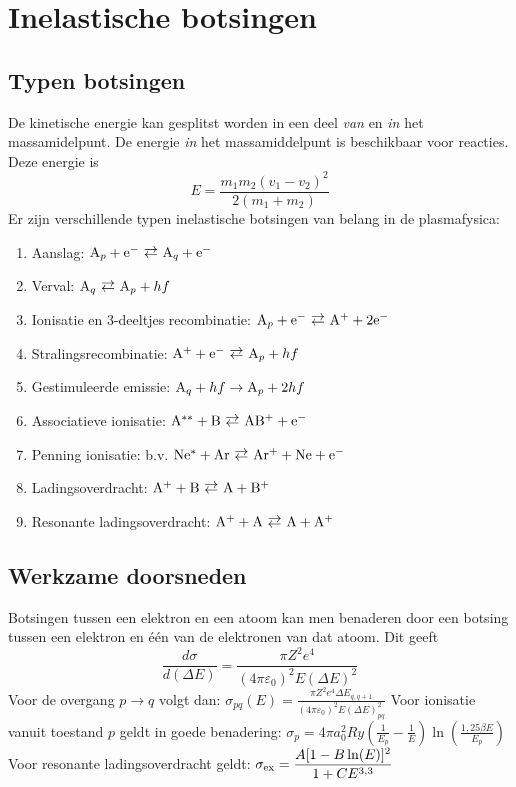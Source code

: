 \section{Inelastische botsingen}
\subsection{Typen botsingen}
De kinetische energie kan gesplitst worden in een deel {\it van} en {\it in}
het massamidelpunt. De energie {\it in} het massamiddelpunt is beschikbaar
voor reacties. Deze energie is
\[
E=\frac{m_1m_2(v_1-v_2)^2}{2(m_1+m_2)}
\]
Er zijn verschillende typen inelastische botsingen van belang in de plasmafysica:
\begin{enumerate}
\item Aanslag: ${\rm A}_p+{\rm e}^-\rlarrow{\rm A}_q+{\rm e}^-$
\item Verval: ${\rm A}_q\rlarrow{\rm A}_p+hf$
\item Ionisatie en 3-deeltjes recombinatie:
      ${\rm A}_p+{\rm e}^-\rlarrow{\rm A}^++2{\rm e}^-$
\item Stralingsrecombinatie: ${\rm A}^++{\rm e}^-\rlarrow{\rm A}_p+hf$
\item Gestimuleerde emissie: ${\rm A}_q+hf\rightarrow{\rm A}_p+2hf$
\item Associatieve ionisatie: $\rm A^{**}+B\rlarrow AB^++e^-$
\item Penning ionisatie: b.v. $\rm Ne^*+Ar\rlarrow Ar^++Ne+e^-$
\item Ladingsoverdracht: $\rm A^++B\rlarrow A+ B^+$
\item Resonante ladingsoverdracht: $\rm A^++A\rlarrow A+A^+$
\end{enumerate}

\subsection{Werkzame doorsneden}
Botsingen tussen een elektron en een atoom kan men benaderen door een
botsing tussen een elektron en \'e\'en van de elektronen van dat atoom. Dit
geeft
\[
\frac{d\sigma}{d(\Delta E)}=\frac{\pi Z^2 e^4}{(4\pi\varepsilon_0)^2E(\Delta E)^2}
\]
Voor de overgang $p\rightarrow q$ volgt dan:
$\displaystyle
\sigma_{pq}(E)=\frac{\pi Z^2e^4\Delta E_{q,q+1}}{(4\pi\varepsilon_0)^2E(\Delta E)_{pq}^2}
$
\npar
Voor ionisatie vanuit toestand $p$ geldt in goede benadering:
$\displaystyle
\sigma_p=4\pi a_0^2 Ry\left(\frac{1}{E_p}-\frac{1}{E}\right)\ln\left(\frac{1,25\beta E}{E_p}\right)
$
\npar
Voor resonante ladingsoverdracht geldt:
$\displaystyle\sigma_{\rm ex}=\frac{A[1-B\ln(E)]^2}{1+CE^{3,3}}$


